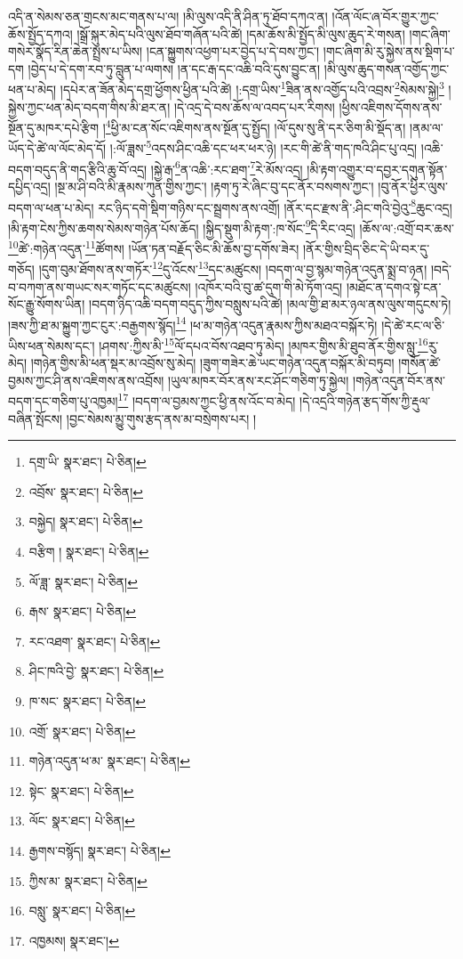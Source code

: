 འདི་ན་སེམས་ཅན་གྲངས་མང་གནས་པ་ལ། །མི་ལུས་འདི་ནི་ཤིན་ཏུ་ཐོབ་དཀའ་ན། །འོན་ལོང་ཞ་བོར་གྱུར་ཀྱང་ཆོས་སྤྱོད་དཀའ། །སྒྲོ་སྐུར་མེད་པའི་ལུས་ཐོབ་གཞོན་པའི་ཚེ། །དམ་ཆོས་མི་སྤྱོད་མི་ལུས་ཆུད་རེ་གསན། །གང་ཞིག་གསེར་སྣོད་རིན་ཆེན་སྤྲས་པ་ཡིས། །ངན་སྐྱུགས་འཕྱག་པར་བྱེད་པ་དེ་བས་ཀྱང་། །གང་ཞིག་མི་རུ་སྐྱེས་ནས་སྡིག་པ་དག །བྱེད་པ་དེ་དག་རབ་ཏུ་བླུན་པ་ལགས། །ན་དང་རྒ་དང་འཆི་བའི་དུས་བྱུང་ན། །མི་ལུས་ཆུད་གསན་འགྱོད་ཀྱང་ཕན་པ་མེད། །དཔེར་ན་ཟོན་མེད་དགྲ་ཕྱོགས་ཕྱིན་པའི་ཚེ། །:དགྲ་ཡིས་\footnote{དགྲ་ཡི་  སྣར་ཐང་།  པེ་ཅིན། }ཟིན་ནས་འགྱོད་པའི་འབྲས་\footnote{འབྲོས་  སྣར་ཐང་།  པེ་ཅིན། }སེམས་སྐྱེ།\footnote{བསྐྱེད།  སྣར་ཐང་།  པེ་ཅིན། } །སྐྱེས་ཀྱང་ཕན་མེད་བདག་གིས་མི་ཐར་ན། །དེ་འདྲ་དེ་བས་ཆོས་ལ་འབད་པར་རིགས། །ཕྱིས་འཇིགས་དོགས་ནས་སྔོན་དུ་མཁར་དཔེ་རྩིག །\footnote{བརྩིག །  སྣར་ཐང་།  པེ་ཅིན། }ཕྱི་མ་ངན་སོང་འཇིགས་ནས་སྔོན་དུ་སྤྱོད། །ལོ་དུས་སུ་ནི་དར་ཅིག་མི་སྡོད་ན། །ནམ་ལ་ཡོད་དེ་ཚེ་ལ་ལོང་མེད་དོ། །:ལོ་ཟླས་\footnote{ལོ་ཟླ་  སྣར་ཐང་།  པེ་ཅིན། }འདས་ཤིང་འཆི་དང་ཕར་ཕར་ཉེ། །རང་གི་ཚེ་ནི་གད་ཁའི་ཤིང་པུ་འདྲ། །འཆི་བདག་བདུད་ནི་གད་རྩིའི་ཆུ་བོ་འདྲ། །སྐྱེ་རྒ་\footnote{རྒས་  སྣར་ཐང་།  པེ་ཅིན། }ན་འཆི་:རང་ཐག་\footnote{རང་འཐག་  སྣར་ཐང་།  པེ་ཅིན། }རེ་མོས་འདྲ། །མི་རྟག་འགྱུར་བ་དབྱར་དགུན་སྟོན་དཔྱིད་འདྲ། །སྔ་མ་ཤི་བའི་མི་རྣམས་ཀུན་གྱིས་ཀྱང་། །རྟག་ཏུ་རེ་ཞིང་བུ་དང་ནོར་བསགས་ཀྱང་། །བུ་ནོར་ཕྱིར་ལུས་བདག་ལ་ཕན་པ་མེད། རང་ཉིད་དགེ་སྡིག་གཉིས་དང་སྦྲགས་ནས་འགྲོ། །ནོར་དང་རྫས་ནི་:ཤིང་གའི་བྱེའུ་\footnote{ཤིང་ཁའི་བྱེ་  སྣར་ཐང་།  པེ་ཅིན། }ཆུང་འདྲ། །མི་རྟག་ངེས་ཀྱིས་ཆགས་སེམས་གཉེན་པོས་ཆོད། །སྐྱིད་སྡུག་མི་རྟག་:ཁ་སོང་\footnote{ཁ་སང་  སྣར་ཐང་།  པེ་ཅིན། }དི་རིང་འདྲ། །ཆོས་ལ་:འགྲོ་བར་ཆས་\footnote{འགྲོ་  སྣར་ཐང་།  པེ་ཅིན། }ཚེ་:གཉེན་འདུན་\footnote{གཉེན་འདུན་ཕ་མ་  སྣར་ཐང་།  པེ་ཅིན། }ཚོགས། །ཡོན་ཏན་བརྗོད་ཅིང་མི་ཆོས་བྱ་དགོས་ཟེར། །ནོར་གྱིས་བྲིད་ཅིང་དེ་ཡི་བར་དུ་གཅོད། །དུག་བུམ་ཐོགས་ནས་གཏོར་\footnote{སྟེང་  སྣར་ཐང་།  པེ་ཅིན། }དུ་འོངས་\footnote{ལོང་  སྣར་ཐང་།  པེ་ཅིན། }དང་མཚུངས། །བདག་ལ་བྱ་སྙམ་གཉེན་འདུན་སྨྲ་བ་ཉན། །བདེ་བ་བཀག་ནས་གཡང་སར་གཏོང་དང་མཚུངས། །འཁོར་བའི་བུ་ཚ་དུག་གི་མེ་ཏོག་འདྲ། །མཐོང་ན་དགའ་སྟེ་ངན་སོང་རྒྱུ་སོགས་ཡིན། །བདག་ཉིད་འཆི་བདག་བདུད་ཀྱིས་བསླུས་པའི་ཚེ། །མལ་གྱི་ཐ་མར་ཉལ་ནས་ལུས་གདུངས་ཏེ། །ཟས་ཀྱི་ཐ་མ་སྐྱུག་ཀྱང་ངུར་:བརྒྱགས་སྙོད།\footnote{རྒྱགས་བསྙོད།  སྣར་ཐང་།  པེ་ཅིན། } །ཕ་མ་གཉེན་འདུན་རྣམས་ཀྱིས་མཐའ་བསྐོར་ཏེ། །དེ་ཚེ་རང་ལ་ཅི་ཡིས་ཕན་སེམས་དང་། །ཤགས་:ཀྱིས་མི་\footnote{ཀྱིས་མ་  སྣར་ཐང་།  པེ་ཅིན། }ལོ་དཔའ་བོས་འཐབ་ཏུ་མེད། །མཁར་གྱིས་མི་ཐུབ་ནོར་གྱིས་སླུ་\footnote{བསླུ་  སྣར་ཐང་།  པེ་ཅིན། }རུ་མེད། །གཉེན་གྱིས་མི་ཕན་སྡར་མ་འབྲོས་སུ་མེད། །ཟུག་གཟེར་ཆེ་ཡང་གཉེན་འདུན་བསྐོར་མི་བཏུབ། །གསོན་ཚེ་བྱམས་ཀྱང་ཤི་ནས་འཇིགས་ནས་འབྲོས། །ཡུལ་མཁར་བོར་ནས་རང་ཤོང་གཅིག་ཏུ་སྐྱེལ། །གཉེན་འདུན་བོར་ནས་བདག་དང་གཅིག་པུ་འཁྱམ།\footnote{འཁྱམས།  སྣར་ཐང་། } །བདག་ལ་བྱམས་ཀྱང་ཕྱི་ནས་འོང་བ་མེད། །དེ་འདྲའི་གཉེན་རྩད་གོས་ཀྱི་རྡུལ་བཞིན་སྤོངས། །བྱང་སེམས་མྱུ་གུས་རྩད་ནས་མ་བསྲེགས་པར། །

